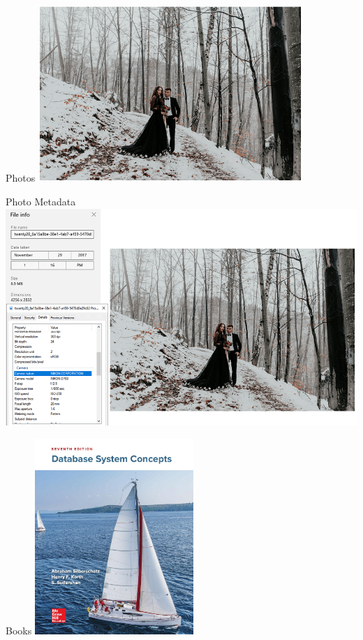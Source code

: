 \documentclass{beamer}
\begin{document}
\begin{frame}{Photos}
    \centering
    \includegraphics[width=0.75\textwidth]{figures/photo}
\end{frame}
\begin{frame}{Photo Metadata}
    \centering
    \includegraphics[width=\textwidth]{figures/photometa}
\end{frame}
\begin{frame}{Books}
    \centering
    \includegraphics[width=0.45\textwidth]{figures/book}
\end{frame}
\end{document}
